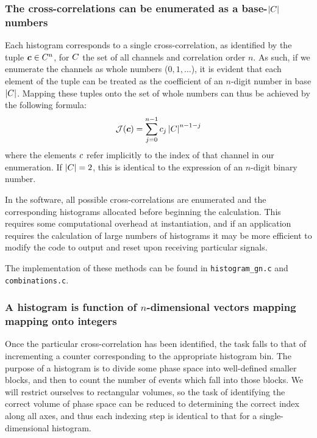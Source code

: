 \subsubsection{The cross-correlations can be enumerated as a base-$\left|C\right|$ numbers}
Each histogram corresponds to a single cross-correlation, as identified by the tuple $\boldsymbol{c}\in C^{n}$, for $C$ the set of all channels and correlation order $n$. As such, if we enumerate the channels as whole numbers ($0, 1, \ldots$), it is evident that each element of the tuple can be treated as the coefficient of an $n$-digit number in base $\left|C\right|$. Mapping these tuples onto the set of whole numbers can thus be achieved by the following formula:
\begin{equation}
\mathcal{J}(\boldsymbol{c}) = \sum_{j=0}^{n-1}{c_{j}\left|C\right|^{n-1-j}}
\end{equation}
where the elements $c$ refer implicitly to the index of that channel in our enumeration.
If $\left|C\right|=2$, this is identical to the expression of an $n$-digit binary number.

In the software, all possible cross-correlations are enumerated and the corresponding histograms allocated before beginning the calculation. This requires some computational overhead at instantiation, and if an application requires the calculation of large numbers of histograms it may be more efficient to modify the code to output and reset upon receiving particular signals.

The implementation of these methods can be found in \texttt{histogram\_gn.c} and \texttt{combinations.c}.

\subsubsection{A histogram is function of $n$-dimensional vectors mapping mapping onto integers}
Once the particular cross-correlation has been identified, the task falls to that of incrementing a counter corresponding to the appropriate histogram bin. The purpose of a histogram is to divide some phase space into well-defined smaller blocks, and then to count the number of events which fall into those blocks. We will restrict ourselves to rectangular volumes, so the task of identifying the correct volume of phase space can be reduced to determining the correct index along all axes, and thus each indexing step is identical to that for a single-dimensional histogram. 

